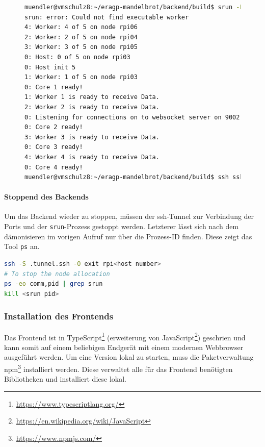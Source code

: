 \begin{figure}[h]
	\begin{lstlisting}[language=bash, caption={Beispielhafter Start des Backends. Hierbei ist der Knoten des Hostprozesses \texttt{rpi03}.}, label={shell:himmuc_running_backend_example}]
muendler@vmschulz8:~/eragp-mandelbrot/backend/build$ srun -N4 -n5 -l --multi-prog ../himmuc/run.conf
srun: error: Could not find executable worker
4: Worker: 4 of 5 on node rpi06
2: Worker: 2 of 5 on node rpi04
3: Worker: 3 of 5 on node rpi05
0: Host: 0 of 5 on node rpi03
0: Host init 5
1: Worker: 1 of 5 on node rpi03
0: Core 1 ready!
1: Worker 1 is ready to receive Data.
2: Worker 2 is ready to receive Data.
0: Listening for connections on to websocket server on 9002
0: Core 2 ready!
3: Worker 3 is ready to receive Data.
0: Core 3 ready!
4: Worker 4 is ready to receive Data.
0: Core 4 ready!
muendler@vmschulz8:~/eragp-mandelbrot/backend/build$ ssh ssh -L 0.0.0.0:9002:localhost:9002 -fN -M -S .tunnel.ssh rpi03
    \end{lstlisting}
\end{figure}

\paragraph{Stoppend des Backends}

Um das Backend wieder zu stoppen, müssen der ssh-Tunnel zur Verbindung der Ports
und der \verb|srun|-Prozess gestoppt werden.
Letzterer lässt sich nach dem dämonisieren im vorigen Aufruf nur über die Prozess-ID finden.
Diese zeigt das Tool \verb|ps| an.
\begin{lstlisting}[language=bash]
ssh -S .tunnel.ssh -O exit rpi<host number>
# To stop the node allocation
ps -eo comm,pid | grep srun
kill <srun pid>
\end{lstlisting}

\subsubsection{Installation des Frontends}
Das Frontend ist in TypeScript\footnote{\url{https://www.typescriptlang.org/}} (erweiterung von JavaScript\footnote{\url{https://en.wikipedia.org/wiki/JavaScript}})
geschrien und kann somit auf einem beliebigen Endgerät mit einem modernen Webbrowser ausgeführt werden.
Um eine Version lokal zu starten, muss die Paketverwaltung npm\footnote{\url{https://www.npmjs.com/}} installiert werden. Diese verwaltet alle
für das Frontend benötigten Bibliotheken und installiert diese lokal.

